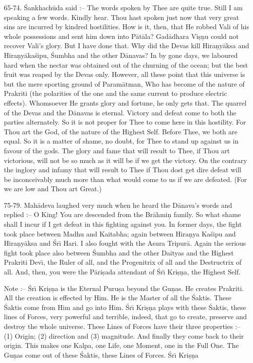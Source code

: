 65-74. \'Sankhach\=uda said :-- The words spoken by Thee are quite true. Still I am speaking a few words. Kindly hear. Thou hast spoken just now that very great sins are incurred by kindred hostilities. How is it, then, that He robbed Vali of his whole possessions and sent him down into P\=at\=ala? Gad\=adhara Vi\d{s}\d{n}u could not recover Vali's glory. But I have done that. Why did the Devas kill Hira\d{n}y\=aksa and Hira\d{n}y\=aka\'sipu, \'Sumbha and the other D\=anavas? In by gone days, we laboured hard when the nectar was obtained out of the churning of the ocean; but the best fruit was reaped by the Devas only. However, all these point that this universe is but the mere sporting ground of Param\=atman, Who has become of the nature of Prakriti (the polarities of the one and the same current to produce electric effects). Whomsoever He grants glory and fortune, he only gets that. The quarrel of the Devas and the D\=anavas is eternal. Victory and defeat come to both the parties alternately. So it is not proper for Thee to come here in this hostility. For Thou art the God, of the nature of the Highest Self. Before Thee, we both are equal. So it is a matter of shame, no doubt, for Thee to stand up against us in favour of the gods. The glory and fame that will result to Thee, if Thou art victorious, will not be so much as it will be if we get the victory. On the contrary the inglory and infamy that will result to Thee if Thou dost get dire defeat will be inconceivably much more than what would come to us if we are defeated. (For we are low and Thou art Great.)

75-79. Mah\=adeva laughed very much when he heard the D\=anava's words and replied :-- O King! You are descended from the Br\=ahmi\d{n} family. So what shame shall I incur if I get defeat in this fighting against you. In former days, the fight took place between Madhu and Kaitabha; again between Hira\d{n}ya Ka\'sipu and Hira\d{n}y\=aksa and \'Sr\={\i} Hari. I also fought with the Asura Tripur\=a. Again the serious fight took place also between \'Sumbha and the other Daityas and the Highest Prakriti Dev\={\i}, the Ruler of all, and the Progenitrix of all and the Destructrix of all. And, then, you were the P\=ari\d{s}ada attendant of \'Sr\={\i} Kri\d{s}\d{n}a, the Highest Self.

Note :-- \'Sr\={\i} Kri\d{s}\d{n}a is the Eternal Puru\d{s}a beyond the Gu\d{n}as. He creates Prakriti. All the creation is effected by Him. He is the Master of all the \'Saktis. These \'Saktis come from Him and go into Him. \'Sr\={\i} Kri\d{s}\d{n}a plays with these \'Saktis, these lines of Forces, very powerful and terrible, indeed, that go to create, preserve and destroy the whole universe. These Lines of Forces have their three properties :-- (1) Origin; (2) direction and (3) magnitude. And finally they come back to their origin. This makes one Kalpa, one Life, one Moment, one in the Full One. The Gu\d{n}as come out of these \'Saktis, these Lines of Forces. \'Sr\={\i} Kri\d{s}\d{n}a

